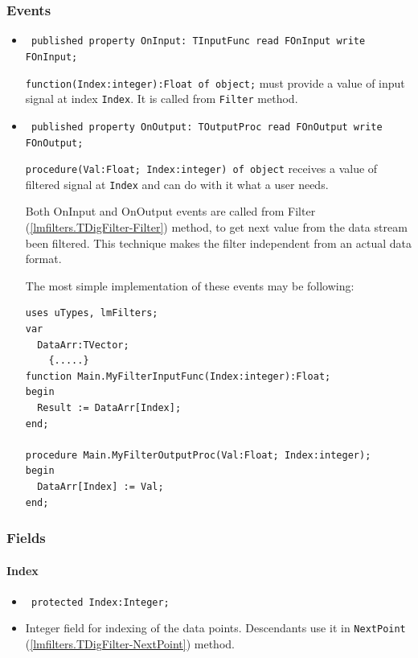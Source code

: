 \documentclass[12pt,a4paper,oneside]{report}
\newcommand{\declarationitem}[1]{{\addfontfeatures{FakeSlant} #1}}
\newcommand{\descriptiontitle}[1]{{\addfontfeatures{FakeSlant}#1}}
\newcommand{\inlineitem}[1]{{\addfontfeatures{FakeBold} #1}}
\newcommand{\code}[1]{\texttt{#1}}
\begin{document}
\subsubsection{Events}
\begin{itemize}\label{lmfilters.TDigFilter-OnInput}
	\item[\inlineitem{OnInput}\hfill]
	\begin{flushleft}
		\code{
			published property OnInput: TInputFunc read FOnInput write FOnInput;}
	\end{flushleft}
	\par \code{function(Index:integer):Float of object;} must provide a value of input signal at index \code{Index}. It is called from \code{Filter}\label{lmfilters.TDigFilter-OnOutput} method.
	\item[\inlineitem{OnOutput}\hfill]
	\begin{flushleft}
		\code{
			published property OnOutput: TOutputProc read FOnOutput write FOnOutput;}
	\end{flushleft}
	\par \code{procedure(Val:Float; Index:integer) of object} receives a value of filtered signal at \code{Index} and can do with it what a user needs.

	Both OnInput and OnOutput events are called from Filter (\ref{lmfilters.TDigFilter-Filter}) method, to get next value from the data stream been filtered. This technique makes the filter independent from an actual data format.

	The most simple implementation of these events may be following:
\begin{verbatim}
uses uTypes, lmFilters;
var
  DataArr:TVector;
	{.....}
function Main.MyFilterInputFunc(Index:integer):Float;
begin
  Result := DataArr[Index];
end;

procedure Main.MyFilterOutputProc(Val:Float; Index:integer);
begin
  DataArr[Index] := Val;
end;
\end{verbatim}
\end{itemize}
\subsubsection{Fields}
\paragraph{Index}\label{lmfilters.TDigFilter-index}
\begin{itemize}
	\item[\declarationitem{Declaration}\hfill]
	\begin{flushleft}
		\code{
			protected Index:Integer;}
	\end{flushleft}
	\par  
\item[\descriptiontitle{Description}]
Integer field for indexing of the data points. Descendants use it in \code{NextPoint} (\ref{lmfilters.TDigFilter-NextPoint}) method.
\end{itemize}
\end{document}

